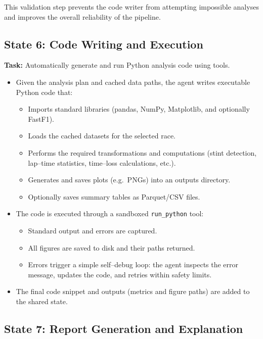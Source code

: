 \documentclass[11pt]{article}
\begin{document}
This validation step prevents the code writer from attempting impossible analyses and improves the overall reliability of the pipeline.

\subsection*{State 6: Code Writing and Execution}

\textbf{Task:} Automatically generate and run Python analysis code using tools.

\begin{itemize}[leftmargin=1.5em]
    \item Given the analysis plan and cached data paths, the agent writes executable Python code that:
    \begin{itemize}
        \item Imports standard libraries (pandas, NumPy, Matplotlib, and optionally FastF1).
        \item Loads the cached datasets for the selected race.
        \item Performs the required transformations and computations (stint detection, lap–time statistics, time–loss calculations, etc.).
        \item Generates and saves plots (e.g.\ PNGs) into an outputs directory.
        \item Optionally saves summary tables as Parquet/CSV files.
    \end{itemize}
    \item The code is executed through a sandboxed \texttt{run\_python} tool:
    \begin{itemize}
        \item Standard output and errors are captured.
        \item All figures are saved to disk and their paths returned.
        \item Errors trigger a simple self–debug loop: the agent inspects the error message, updates the code, and retries within safety limits.
    \end{itemize}
    \item The final code snippet and outputs (metrics and figure paths) are added to the shared state.
\end{itemize}

\subsection*{State 7: Report Generation and Explanation}
\end{document}
